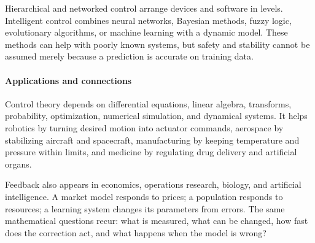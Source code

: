 Hierarchical and networked control arrange devices and software in levels. Intelligent control combines neural networks, Bayesian methods, fuzzy logic, evolutionary algorithms, or machine learning with a dynamic model. These methods can help with poorly known systems, but safety and stability cannot be assumed merely because a prediction is accurate on training data. \cite{control_theory_ref6,control_theory_ref10}

\paragraph{Applications and connections}

Control theory depends on differential equations, linear algebra, transforms, probability, optimization, numerical simulation, and dynamical systems. It helps robotics by turning desired motion into actuator commands, aerospace by stabilizing aircraft and spacecraft, manufacturing by keeping temperature and pressure within limits, and medicine by regulating drug delivery and artificial organs.

Feedback also appears in economics, operations research, biology, and artificial intelligence. A market model responds to prices; a population responds to resources; a learning system changes its parameters from errors. The same mathematical questions recur: what is measured, what can be changed, how fast does the correction act, and what happens when the model is wrong?

